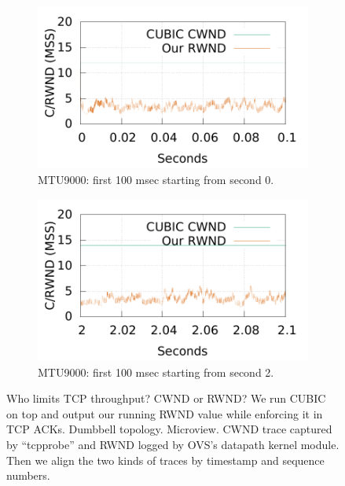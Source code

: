 \begin{figure}[!htb]
        \begin{subfigure}[b]{0.225\textwidth}
                \centering
                \includegraphics[width=\textwidth]{figures/cwnd_rwnd2/mtu9000_cubic/cubic_measure_cwnd_rwnd_gap_9k_5flows_0sec_100msec.pdf}
                \caption{MTU9000: first 100 msec starting from second 0.}
                \label{who_limits_cwnd_rwnd_9000_0sec}
        \end{subfigure}
        \begin{subfigure}[b]{0.225\textwidth}
                \centering
                \includegraphics[width=\textwidth]{figures/cwnd_rwnd2/mtu9000_cubic/cubic_measure_cwnd_rwnd_gap_9k_5flows_2sec_100msec.pdf}
                \caption{MTU9000: first 100 msec starting from second 2.}
                \label{who_limits_cwnd_rwnd_9000_2sec}
        \end{subfigure}
        \caption{Who limits TCP throughput? CWND or RWND? We run CUBIC on top and output our running RWND value
                while enforcing it in TCP ACKs. Dumbbell topology. Microview. CWND trace captured by ``tcpprobe'' and
                RWND logged by OVS's datapath kernel module. Then we align the two kinds of traces by timestamp and sequence numbers.}
        \label{who_limits_compare_cwnd_rwnd}
\end{figure}


